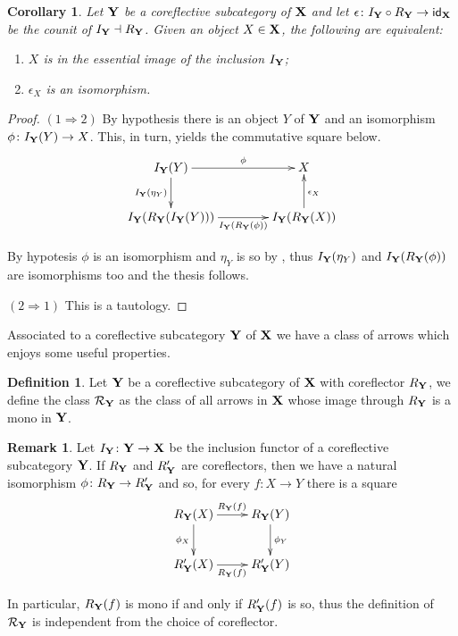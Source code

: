 \documentclass[a4paper]{article}
\newcommand{\id}[1]{\mathsf{id}_{#1}}
\def\R{\mathsf{R}}
\def\X{\textbf {\textup{X}}}
\def\Y{\textbf {\textup{Y}}}
\newtheorem{corollary}[theorem]{Corollary}
\theoremstyle{definition}
\newtheorem{definition}[theorem]{Definition}
\newtheorem{remark}[theorem]{Remark}
\begin{document}
\begin{corollary}\label{cor:counit}
Let $\Y$ be a coreflective subcategory of $\X$ and let $\epsilon \colon I_\Y\circ R_\Y \to  \id{\X}$ be the counit of $I_\Y\dashv R_\Y$. Given an object $X\in \X$, the following are equivalent:
\begin{enumerate}
	\item $X$ is in the essential image of the inclusion $I_\Y$;
	\item $\epsilon_X$ is an isomorphism.
\end{enumerate} 
\end{corollary}
\begin{proof}
	$(1\Rightarrow 2)$ By hypothesis there is an object $Y$ of $\Y$ and an isomorphism $\phi\colon I_\Y(Y)\to X$. This, in turn, yields the commutative square below.
	\[\xymatrix@C=40pt{I_\Y(Y) \ar[r]^-{\phi} \ar[d]_{I_\Y(\eta_Y)}&  X\\ I_\Y(R_\Y(I_\Y(Y)))  \ar[r]_-{I_\Y(R_\Y(\phi))}& I_\Y(R_\Y(X)) \ar[u]_{\epsilon_X}}\]
	
	By hypotesis $\phi$ is an isomorphism and $\eta_Y$ is so by , thus $I_\Y(\eta_Y)$ and 
$I_\Y(R_\Y(\phi))$ are isomorphisms too and the thesis follows.

	\smallskip \noindent
	$(2\Rightarrow 1)$ This is a tautology.
\end{proof}

Associated to a coreflective subcategory $\Y$ of $\X$ we have a class of arrows which enjoys some useful properties.
 
 \begin{definition}
 	Let $\Y$ be a coreflective subcategory of $\X$ with coreflector $R_\Y$, we define the class $\mathcal{R}_\Y$ as the class of all arrows in $\X$ whose image through $R_\Y$ is a mono in $\Y$.
 \end{definition}
 
 \begin{remark}
 	Let $I_\Y\colon \Y \to \X$ be the inclusion functor of a coreflective subcategory $\Y$. If $R_\Y$ and $R'_\Y$ are coreflectors, then we have a natural isomorphism $\phi\colon R_\Y\to R'_\Y$ and so, for every $f\colon X\to Y$ there is a square
 	\[\xymatrix{ \ar[d]_{\phi_X} R_\Y(X) \ar[r]^{R_\Y(f)}& R_\Y(Y) \ar[d]^{\phi_Y}\\R'_\Y(X) \ar[r]_{R_\Y(f)} & R'_\Y(Y)}\]
 
 In particular, $R_\Y(f)$ is mono if and only if $R'_\Y(f)$ is so, thus the definition of $\mathcal{R}_\Y$ is independent from the choice of coreflector.
 \end{remark}
 
\end{document}
